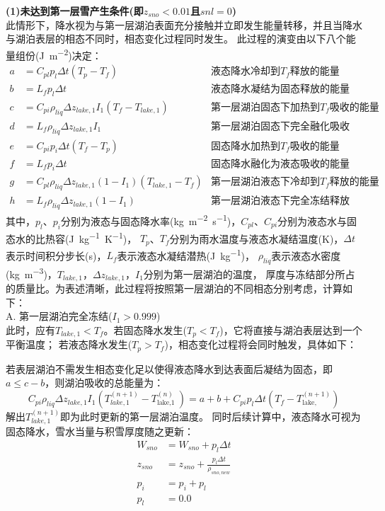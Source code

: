 \textbf {(1)未达到第一层雪产生条件(即$z_{sno}<0.01$且$snl=0$)}\\
此情形下，降水视为与第一层湖泊表面充分接触并立即发生能量转移，并且当降水与湖泊表层的相态不同时，相态变化过程同时发生。
此过程的演变由以下八个能量组份(\unit{J.m^{-2}})决定：
\begin{align*}
a &= C_{pl} p_{l} \Delta t\left(T_{p}-T_{f}\right)   & \text{液态降水冷却到$T_f$释放的能量} \\
b &= L_f p_l \Delta t                                           & \text{液态降水凝结为固态释放的能量} \\
c &= C_{pi} \rho_{liq} \Delta z_{lake, 1} I_{1}\left(T_f-T_{lake, 1}\right)  & \text{第一层湖泊固态下加热到$T_f$吸收的能量} \\
d &= L_f \rho_{liq} \Delta z_{lake, 1} I_{1}         & \text{第一层湖泊固态下完全融化吸收的能量} \\
e &= C_{pi} p_i \Delta t\left(T_f -T_p\right)        & \text{固态降水加热到$T_f$吸收的能量} \\
f &= L_f p_i \Delta t                                           & \text{固态降水融化为液态吸收的能量} \\
g &= C_{pl} \rho_{liq} \Delta z_{lake, 1}\left(1-I_{1}\right)\left(T_{lake, 1}-T_f\right)  & \text{第一层湖泊液态下冷却到$T_f$释放的能量} \\
h &= L_f \rho_{liq} \Delta z_{lake, 1}\left(1-I_{1}\right)  & \text{第一层湖泊液态下完全冻结释放的能量}
\end{align*}
其中，$p_l$、$p_i$分别为液态与固态降水率(\unit{kg.m^{-2}.s^{-1}})，$C_{pl}$、$C_{pi}$分别为液态水与固态水的比热容(\unit{J.kg^{-1}.K^{-1}})，
$T_p$、$T_f$分别为雨水温度与液态水凝结温度(K)，$\Delta t$表示时间积分步长(s)，$L_f$表示液态水凝结潜热(\unit{J.kg^{-1}})，
$\rho_{liq}$表示液态水密度(\unit{kg.m^{-3}})，$T_{lake,1}$，$\Delta z_{lake,1}$，$I_1$分别为第一层湖泊的温度，
厚度与冻结部分所占的质量比。为表述清晰，此过程将按照第一层湖泊的不同相态分别考虑，计算如下：\\

A. 第一层湖泊完全冻结($I_1>0.999$)\\
此时，应有$T_{lake,1}<T_f$。若固态降水发生($T_p<T_f$)，它将直接与湖泊表层达到一个平衡温度；
若液态降水发生($T_p>T_f$)，相态变化过程将会同时触发，具体如下：

若表层湖泊不需发生相态变化足以使得液态降水到达表面后凝结为固态，即$a\le c-b$，则湖泊吸收的总能量为：
\begin{equation}
C_{pi} \rho_{liq} \Delta z_{lake,1} I_{1}\left(T_{lake, 1}^{(n+1)}-T_{\text {lake,1 }}^{(n)}\right)=a+b+C_{pi} p_{l} \Delta t\left(T_{f}-T_{\text {lake, }}^{(n+1)}\right)
\end{equation}
解出$T_{lake,1}^{\left(n+1\right)}$即为此时更新的第一层湖泊温度。
同时后续计算中，液态降水可视为固态降水，雪水当量与积雪厚度随之更新：
\begin{equation}
\begin{aligned}
W_{sno} &= W_{sno}+p_l \Delta t \\ 
z_{sno} &= z_{sno}+\frac{p_l \Delta t}{\rho_{sno,new}} \\ 
p_i &= p_i + p_l \\ 
p_l &= 0.0
\end{aligned}
\end{equation}


